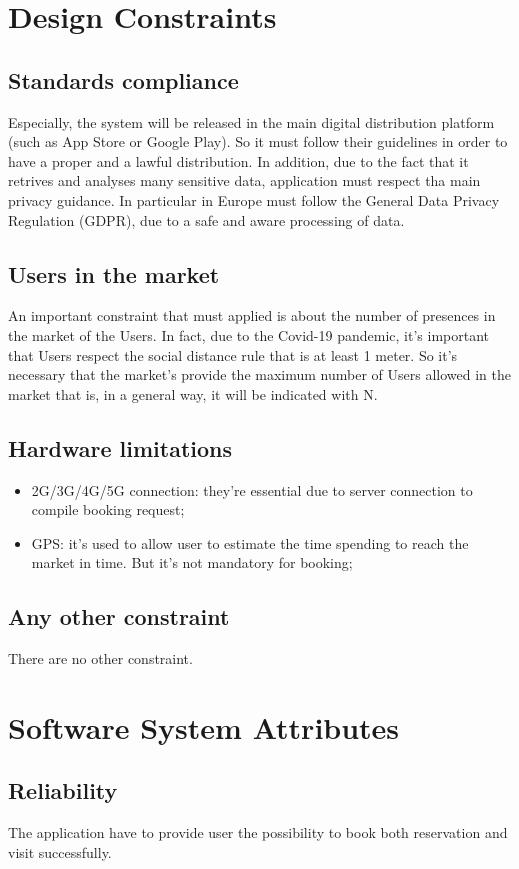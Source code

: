 \section{Design Constraints}
\subsection{Standards compliance}
Especially, the system will be released in the main digital distribution platform (such as App Store or Google Play). So it must follow their guidelines in order to have a proper and a lawful distribution. In addition, due to the fact that it retrives and analyses many sensitive data, application must respect tha main privacy guidance. In particular in Europe must follow the General Data Privacy Regulation (GDPR), due to a safe and aware processing of data. 
\subsection{Users in the market}
An important constraint that must applied is about the number of presences in the market of the Users. In fact, due to the Covid-19 pandemic, it's important that Users respect the social distance rule that is at least 1 meter. So it's necessary that the market's provide the maximum number of Users allowed in the market that is, in a general way, it will be indicated with N.


\subsection{Hardware limitations}
\begin{itemize}
\item 2G/3G/4G/5G connection: they're essential due to server connection to compile booking request;
\item GPS: it's used to allow user to estimate the time spending to reach the market in time. But it's not mandatory for booking;
\end{itemize}
\subsection{Any other constraint}
There are no other constraint.
\section{Software System Attributes}
\subsection{Reliability}
The application have to provide user the possibility to book both reservation and visit successfully. 

